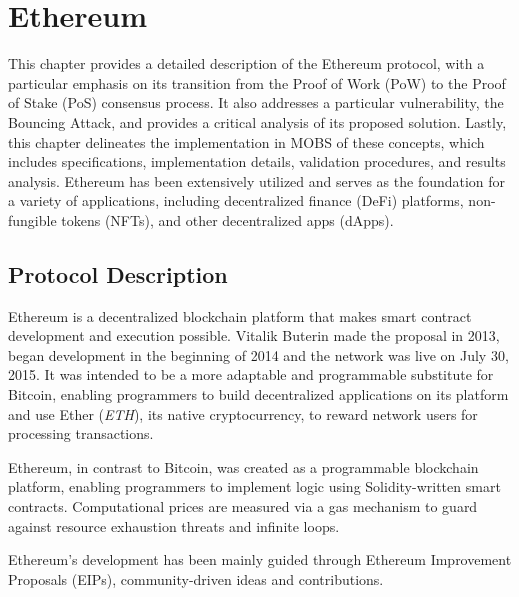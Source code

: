 
%

\chapter{Ethereum}\label{cha:ethereum}

This chapter provides a detailed description of the Ethereum protocol,
with a particular emphasis on its transition from the Proof of Work (PoW) to the Proof of Stake (PoS) consensus process. 
It also addresses a particular vulnerability, the Bouncing Attack, and provides a critical analysis of its proposed solution. 
Lastly, this chapter delineates the implementation in MOBS of these concepts, which includes specifications,
implementation details, validation procedures, and results analysis.
Ethereum has been extensively utilized and serves as the foundation for a variety of applications,
including decentralized finance (DeFi) platforms, non-fungible tokens (NFTs), and other decentralized apps (dApps).

\section{Protocol Description}\label{sub:protocol_description}

Ethereum is a decentralized blockchain platform that makes smart contract development and execution possible.
Vitalik Buterin made the proposal in 2013, began development in the beginning of 2014 and the network was live on July 30, 2015.
It was intended to be a more adaptable and programmable substitute for Bitcoin, enabling programmers to build decentralized
applications on its platform and use Ether (\textit{ETH}), its native cryptocurrency, to reward network users for processing transactions.

Ethereum, in contrast to Bitcoin, was created as a programmable blockchain platform, enabling programmers to implement logic using Solidity-written smart contracts.
Computational prices are measured via a gas mechanism to guard against resource exhaustion threats and infinite loops.

Ethereum's development has been mainly guided through Ethereum Improvement Proposals (EIPs), community-driven ideas and contributions.

